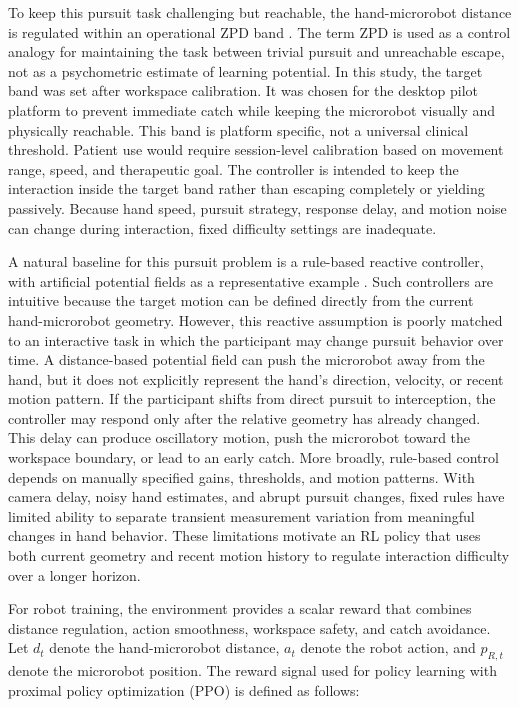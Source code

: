 \documentclass[lettersize,journal]{IEEEtran}
\begin{document}
To keep this pursuit task challenging but reachable, the hand-microrobot distance is regulated within an operational ZPD band \cite{vygotskyMindSociety1978,hocineSeriousGameAdaptation2015}. The term ZPD is used as a control analogy for maintaining the task between trivial pursuit and unreachable escape, not as a psychometric estimate of learning potential. In this study, the target band was set after workspace calibration. It was chosen for the desktop pilot platform to prevent immediate catch while keeping the microrobot visually and physically reachable. This band is platform specific, not a universal clinical threshold. Patient use would require session-level calibration based on movement range, speed, and therapeutic goal. The controller is intended to keep the interaction inside the target band rather than escaping completely or yielding passively. Because hand speed, pursuit strategy, response delay, and motion noise can change during interaction, fixed difficulty settings are inadequate.

A natural baseline for this pursuit problem is a rule-based reactive controller, with artificial potential fields as a representative example \cite{khatibObstacleAvoidance1986,leeVirtualHillAPF2024}. Such controllers are intuitive because the target motion can be defined directly from the current hand-microrobot geometry. However, this reactive assumption is poorly matched to an interactive task in which the participant may change pursuit behavior over time. A distance-based potential field can push the microrobot away from the hand, but it does not explicitly represent the hand's direction, velocity, or recent motion pattern. If the participant shifts from direct pursuit to interception, the controller may respond only after the relative geometry has already changed. This delay can produce oscillatory motion, push the microrobot toward the workspace boundary, or lead to an early catch. More broadly, rule-based control depends on manually specified gains, thresholds, and motion patterns. With camera delay, noisy hand estimates, and abrupt pursuit changes, fixed rules have limited ability to separate transient measurement variation from meaningful changes in hand behavior. These limitations motivate an RL policy that uses both current geometry and recent motion history to regulate interaction difficulty over a longer horizon.

For robot training, the environment provides a scalar reward that combines distance regulation, action smoothness, workspace safety, and catch avoidance. Let $d_t$ denote the hand-microrobot distance, $a_t$ denote the robot action, and $p_{R,t}$ denote the microrobot position. The reward signal used for policy learning with proximal policy optimization (PPO) \cite{schulmanPPO2017} is defined as follows:
\end{document}
